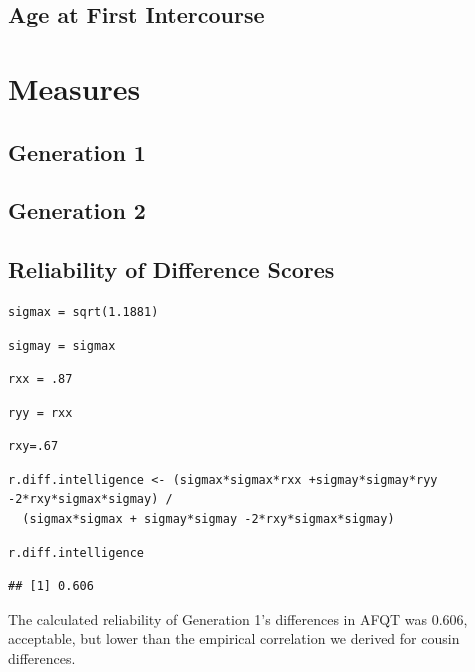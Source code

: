 \documentclass[a4paper,man,apacite,natbib,12pt]{apa6}\usepackage[]{graphicx}\usepackage[]{color}
\makeatletter
\newenvironment{kframe}{%
 \def\at@end@of@kframe{}%
 \ifinner\ifhmode%
  \def\at@end@of@kframe{\end{minipage}}%
  \begin{minipage}{\columnwidth}%
 \fi\fi%
 \def\FrameCommand##1{\hskip\@totalleftmargin \hskip-\fboxsep
 \colorbox{shadecolor}{##1}\hskip-\fboxsep
     \hskip-\linewidth \hskip-\@totalleftmargin \hskip\columnwidth}%
 \MakeFramed {\advance\hsize-\width
   \@totalleftmargin\z@ \linewidth\hsize
   \@setminipage}}%
 {\par\unskip\endMakeFramed%
 \at@end@of@kframe}
\newenvironment{knitrout}{}{} %
\makeatother
\begin{document}
\subsection{Age at First Intercourse}

%
\section{Measures}
%
\subsection{Generation 1}

%
\subsection{Generation 2}

%
\subsection{Reliability of Difference Scores}

\begin{knitrout}
\color{fgcolor}\begin{kframe}
\begin{lstlisting}[style=Rsettings]
sigmax = sqrt(1.1881)\end{lstlisting}
\begin{lstlisting}[style=Rsettings]
sigmay = sigmax\end{lstlisting}
\begin{lstlisting}[style=Rsettings]
rxx = .87\end{lstlisting}
\begin{lstlisting}[style=Rsettings]
ryy = rxx\end{lstlisting}
\begin{lstlisting}[style=Rsettings]
rxy=.67\end{lstlisting}
\begin{lstlisting}[style=Rsettings]
r.diff.intelligence <- (sigmax*sigmax*rxx +sigmay*sigmay*ryy -2*rxy*sigmax*sigmay) /
  (sigmax*sigmax + sigmay*sigmay -2*rxy*sigmax*sigmay)\end{lstlisting}
\begin{lstlisting}[style=Rsettings]
r.diff.intelligence\end{lstlisting}
\begin{lstlisting}[style=Rsettings]
## [1] 0.606
\end{lstlisting}
\end{kframe}
\end{knitrout}
The calculated reliability of Generation 1's differences in AFQT was 0.606, acceptable, but lower than the empirical correlation we derived for cousin differences.\\
\end{document}
